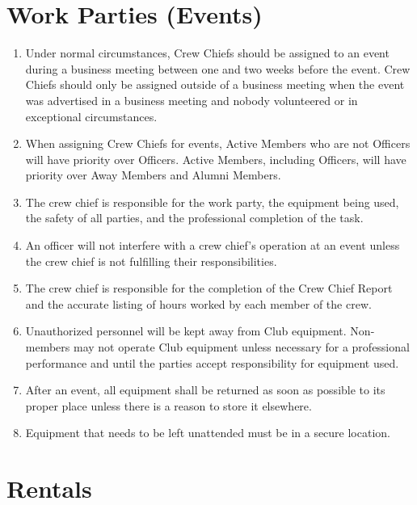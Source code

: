 \documentclass[12pt,letterpaper,oneside]{book}
\begin{document}
\section{Work Parties (Events)}

\begin{enumerate}

\item Under normal circumstances, Crew Chiefs should be assigned to an event during a business meeting between one and two weeks before the event. Crew Chiefs should only be assigned outside of a business meeting when the event was advertised in a business meeting and nobody volunteered or in exceptional circumstances.
\item When assigning Crew Chiefs for events, Active Members who are not Officers will have priority over Officers. Active Members, including Officers, will have priority over Away Members and Alumni Members.
\item The crew chief is responsible for the work party, the equipment being used, the safety of all parties, and the professional completion of the task.
\item An officer will not interfere with a crew chief's operation at an event
    unless the crew chief is not fulfilling their responsibilities.
\item The crew chief is responsible for the completion of the Crew Chief Report and the accurate listing of hours worked by each member of the crew.
\item Unauthorized personnel will be kept away from Club equipment. Non-members may not operate Club equipment unless necessary for a professional performance and until the parties accept responsibility for equipment used.
\item After an event, all equipment shall be returned as soon as possible to its proper place unless there is a reason to store it elsewhere.
\item Equipment that needs to be left unattended must be in a secure location. 

\end{enumerate}

\section{Rentals}
\end{document}
